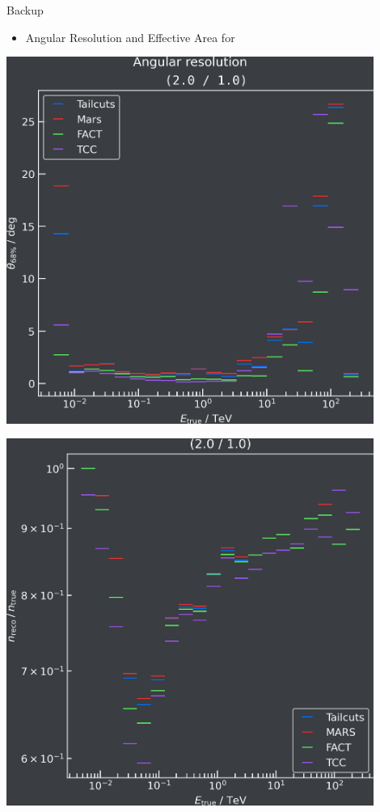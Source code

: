 \begin{frame}{Backup}
    \begin{itemize}
        \item Angular Resolution and Effective Area for 
    \end{itemize}
    \begin{minipage}{0.48\textwidth}
        \includegraphics[width=0.9\textwidth]{plots/ang_res/ang_res_2.0_1.0_dark_no_ylim.png}
      \end{minipage}
      \begin{minipage}{0.48\textwidth}
          \includegraphics[width=0.9\textwidth]{plots/effective_area/aeff_2.0_1.0_dark_no_ylim.png}
      \end{minipage}
\end{frame}